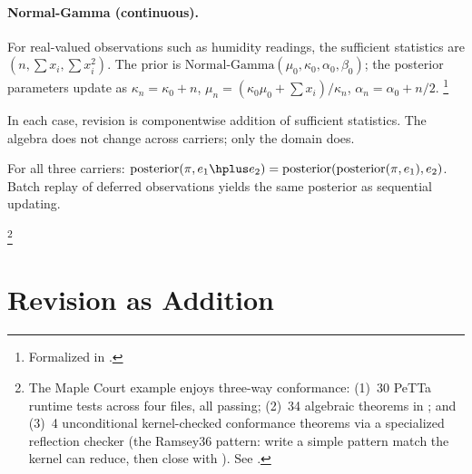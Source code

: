 \documentclass[11pt,openany]{report}
\begin{document}
\paragraph{Normal-Gamma (continuous).}
For real-valued observations such as humidity readings, the sufficient
statistics are $(n, \sum x_i, \sum x_i^2)$.  The prior is
$\text{Normal-Gamma}(\mu_0, \kappa_0, \alpha_0, \beta_0)$; the
posterior parameters update as
$\kappa_n = \kappa_0 + n$,
$\mu_n = (\kappa_0 \mu_0 + \sum x_i) / \kappa_n$,
$\alpha_n = \alpha_0 + n/2$.%
\footnote{Formalized in .}

\medskip\noindent
In each case, revision is componentwise addition of sufficient
statistics.  The algebra does not change across carriers; only the
domain does.

\begin{theorem}
\label{thm:sleep-consolidation}
For all three carriers:
$\mathrm{posterior}(\pi, e_1 \hplus e_2)
= \mathrm{posterior}(\mathrm{posterior}(\pi, e_1), e_2)$.
Batch replay of deferred observations yields the same posterior as
sequential updating.
\end{theorem}

%
\footnote{The Maple Court example enjoys three-way conformance:
(1)~30 PeTTa runtime tests across four  files, all
passing; (2)~34 algebraic theorems in
; and
(3)~4 unconditional kernel-checked conformance theorems via a
specialized reflection checker (the Ramsey36 pattern: write a
simple pattern match the kernel can reduce, then close with
).  See
.}


\section{Revision as Addition}
\end{document}
